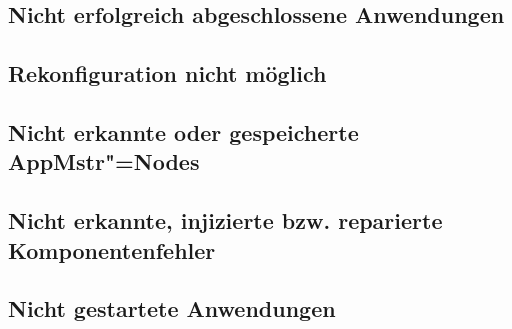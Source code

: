 
\subsection{Nicht erfolgreich abgeschlossene Anwendungen}
\label{sec:failedAppsEval}





\subsection{Rekonfiguration nicht möglich}
\label{sec:noReconfig}






\subsection{Nicht erkannte oder gespeicherte \ac{AppMstr}"=Nodes}
\label{sec:noDetectedHost2}




\subsection{Nicht erkannte, injizierte bzw. reparierte Komponentenfehler}
\label{sec:noDetectedFault}


\subsection{Nicht gestartete Anwendungen}
\label{sec:notStartedApps}


